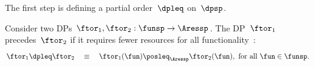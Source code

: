 The first step is defining a partial order~$\dpleq$ on~$\dpsp$.
\begin{definition}
    Consider two DPs $\ftor_{1},\ftor_{2}:\funsp\rightarrow\Aressp$.
    The DP~$\ftor_{1}$ precedes~$\ftor_{2}$ if it requires fewer resources
    for all functionality~\fun:
    \[
        \ftor_{1}\dpleq\ftor_{2}\quad\equiv\quad\ftor_{1}(\fun)\posleq_{\Aressp}\ftor_{2}(\fun),\ \text{for all }\fun\in\funsp.
    \]
\end{definition}

